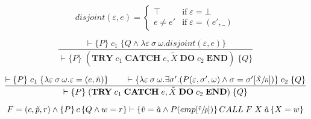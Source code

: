 \begin{equation}
disjoint(\varepsilon, e) = \begin{cases}
\top & \mbox{if} \; \varepsilon = \bot \\
e \neq e' & \mbox{if} \; \varepsilon = (e', \_)
\end{cases}
\end{equation}

\begin{equation}\label{eqn:hoare-try}
\frac{\vdash \{P\} \; c_1 \; \{Q \wedge \lambda \varepsilon\:\sigma\:\omega. disjoint(\varepsilon, e)\}}{\vdash \{P\} \; (\textbf{TRY}\; c_1\; \textbf{CATCH}\; e, \tilde{X}\; \textbf{DO}\; c_2\; \textbf{END}) \; \{Q\}}
\end{equation}

\begin{equation}\label{eqn:hoare-catch}
\frac{\vdash \{P\} \; c_1 \; \{\lambda \varepsilon\:\sigma\:\omega. \varepsilon = (e, \tilde{n})\} \qquad \vdash \{\lambda \varepsilon\:\sigma\:\omega. \exists \sigma'. (P(\varepsilon, \sigma', \omega) \wedge \sigma = \sigma'[\sfrac{\tilde{X}}{\tilde{n}}])\} \; c_2 \; \{Q\}}{\vdash \{P\} \; (\textbf{TRY}\; c_1\; \textbf{CATCH}\; e, \tilde{X}\; \textbf{DO}\; c_2\; \textbf{END}) \; \{Q\}}
\end{equation}

\begin{equation}
F = (c,\tilde{p},r) \wedge \left\{P\right\} c \left\{Q \wedge w = r\right\} \vdash \left\{\tilde{v} = \tilde{a} \wedge P(emp[\sfrac{\tilde{v}}{\tilde{p}}])\right\}CALL \; F \; X \; \tilde{a} \left\{X = w\right\}
\end{equation}